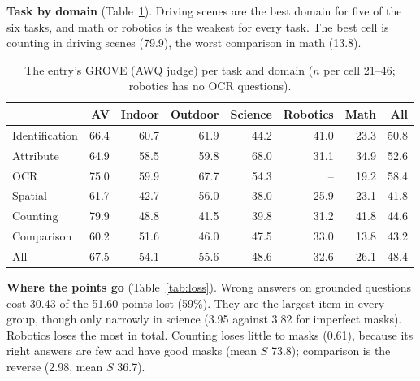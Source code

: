 \documentclass{article}
\newcommand{\ours}{\rowcolor{oursbg}}
\begin{document}
\textbf{Task by domain} (Table~\ref{tab:td}). Driving scenes are the best domain for five of the six tasks, and math or robotics is
the weakest for every task. The best cell is counting in driving scenes (79.9), the worst comparison in math (13.8).

\begin{table}[!htbp]
\centering\scriptsize
\caption{The entry's GROVE (AWQ judge) per task and domain ($n$ per cell 21--46; robotics has no OCR questions).}
\label{tab:td}
\begin{tabular}{lrrrrrrr}
\toprule
 & AV & Indoor & Outdoor & Science & Robotics & Math & All \\
\midrule
Identification & 66.4 & 60.7 & 61.9 & 44.2 & 41.0 & 23.3 & 50.8 \\
Attribute & 64.9 & 58.5 & 59.8 & 68.0 & 31.1 & 34.9 & 52.6 \\
OCR & 75.0 & 59.9 & 67.7 & 54.3 & -- & 19.2 & 58.4 \\
Spatial & 61.7 & 42.7 & 56.0 & 38.0 & 25.9 & 23.1 & 41.8 \\
Counting & 79.9 & 48.8 & 41.5 & 39.8 & 31.2 & 41.8 & 44.6 \\
Comparison & 60.2 & 51.6 & 46.0 & 47.5 & 33.0 & 13.8 & 43.2 \\
\midrule
\ours All & 67.5 & 54.1 & 55.6 & 48.6 & 32.6 & 26.1 & 48.4 \\
\bottomrule
\end{tabular}
\end{table}

\textbf{Where the points go} (Table~\ref{tab:loss}). Wrong answers on grounded questions cost 30.43 of the 51.60 points lost (59\%).
They are the largest item in every group, though only narrowly in science (3.95 against 3.82 for imperfect masks). Robotics loses the
most in total. Counting loses little to masks (0.61), because its right answers are few and have good masks (mean $S$ 73.8);
comparison is the reverse (2.98, mean $S$ 36.7).
\end{document}
